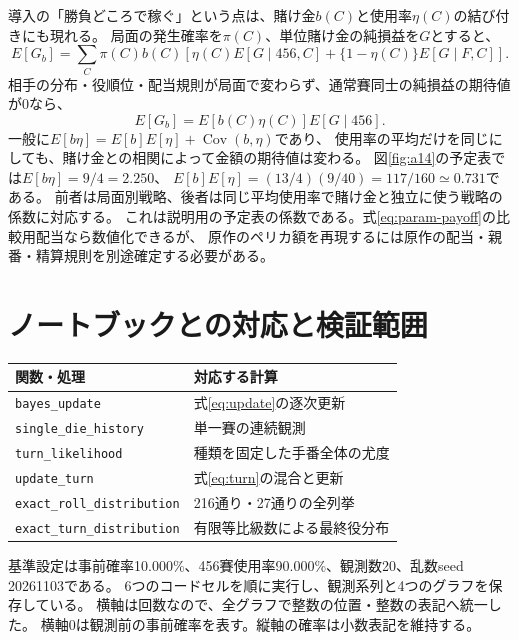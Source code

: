 \documentclass[11pt,a4paper]{article}
\numberwithin{equation}{section}
\begin{document}
導入の「勝負どころで稼ぐ」という点は、賭け金$b(C)$と使用率$\eta(C)$の結び付きにも現れる。
局面の発生確率を$\pi(C)$、単位賭け金の純損益を$G$とすると、
\begin{equation}
E[G_b]=\sum_C\pi(C)b(C)\left[
\eta(C)E[G\mid456,C]+\{1-\eta(C)\}E[G\mid F,C]\right].
\end{equation}
相手の分布・役順位・配当規則が局面で変わらず、通常賽同士の純損益の期待値が0なら、
\begin{equation}
E[G_b]=E[b(C)\eta(C)]E[G\mid456].
\end{equation}
一般に$E[b\eta]=E[b]E[\eta]+\operatorname{Cov}(b,\eta)$であり、
使用率の平均だけを同じにしても、賭け金との相関によって金額の期待値は変わる。
図\ref{fig:a14}の予定表では$E[b\eta]=9/4=2.250$、
$E[b]E[\eta]=(13/4)(9/40)=117/160\simeq0.731$である。
前者は局面別戦略、後者は同じ平均使用率で賭け金と独立に使う戦略の係数に対応する。
これは説明用の予定表の係数である。式\eqref{eq:param-payoff}の比較用配当なら数値化できるが、
原作のペリカ額を再現するには原作の配当・親番・精算規則を別途確定する必要がある。

\clearpage
\section{ノートブックとの対応と検証範囲}
\begin{center}
\begin{tabular}{ll}
\toprule
関数・処理 & 対応する計算\\
\midrule
\texttt{bayes\_update} & 式\eqref{eq:update}の逐次更新\\
\texttt{single\_die\_history} & 単一賽の連続観測\\
\texttt{turn\_likelihood} & 種類を固定した手番全体の尤度\\
\texttt{update\_turn} & 式\eqref{eq:turn}の混合と更新\\
\texttt{exact\_roll\_distribution} & 216通り・27通りの全列挙\\
\texttt{exact\_turn\_distribution} & 有限等比級数による最終役分布\\
\bottomrule
\end{tabular}
\end{center}

基準設定は事前確率10.000\%、456賽使用率90.000\%、観測数20、乱数seed 20261103である。
6つのコードセルを順に実行し、観測系列と4つのグラフを保存している。
横軸は回数なので、全グラフで整数の位置・整数の表記へ統一した。
横軸0は観測前の事前確率を表す。縦軸の確率は小数表記を維持する。
\end{document}
